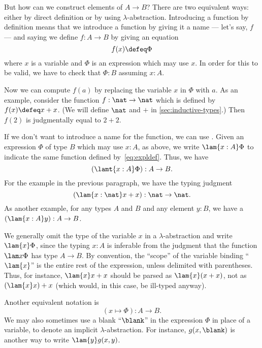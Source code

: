 But how can we construct elements of $A \to B$? There are two equivalent ways:
either by direct definition or by using
$\lambda$-abstraction. Introducing a function by definition
%
means that
we introduce a function by giving it a name --- let's say, $f$ --- and saying
we define $f : A \to B$ by giving an equation
\begin{equation}
  \label{eq:expldef}
  f(x) \defeq \Phi
\end{equation}
where $x$ is a variable
%
and $\Phi$ is an expression which may use $x$.
In order for this to be valid, we have to check that $\Phi : B$ assuming $x:A$.

Now we can compute $f(a)$ by replacing the variable $x$ in $\Phi$ with
$a$. As an example, consider the function $f : \nat \to \nat$ which is
defined by $f(x) \defeq x+x$.  (We will define $\nat$ and $+$ in \cref{sec:inductive-types}.)
Then $f(2)$ is judgmentally equal to $2+2$.

If we don't want to introduce a name for the function, we can use
.
%
%
%
Given an expression $\Phi$ of type $B$ which may use $x:A$, as above, we write $\lam{x:A} \Phi$ to indicate the same function defined by~\eqref{eq:expldef}.
Thus, we have
\[ (\lamt{x:A}\Phi) : A \to B. \]
For the example in the previous paragraph, we have the typing judgment
\[ (\lam{x:\nat}x+x) : \nat \to \nat. \]
As another example, for any types $A$ and $B$ and any element $y:B$, we have a 
%
%
$(\lam{x:A} y): A\to B$.

We generally omit the type of the variable $x$ in a $\lambda$-abstraction and write $\lam{x}\Phi$, since the typing $x:A$ is inferable from the judgment that the function $\lam x \Phi$ has type $A\to B$.
By convention, the ``scope''
%
%
of the variable binding ``$\lam{x}$'' is the entire rest of the expression, unless delimited with parentheses.
Thus, for instance, $\lam{x} x+x$ should be parsed as $\lam{x} (x+x)$, not as $(\lam{x}x)+x$ (which would, in this case, be ill-typed anyway).

Another equivalent notation is
%
\[ (x \mapsto \Phi) : A \to B. \]
%
We may also sometimes use a blank ``$\blank$'' in the expression $\Phi$ in place of a variable, to denote an implicit $\lambda$-abstraction.
For instance, $g(x,\blank)$ is another way to write $\lam{y} g(x,y)$.

